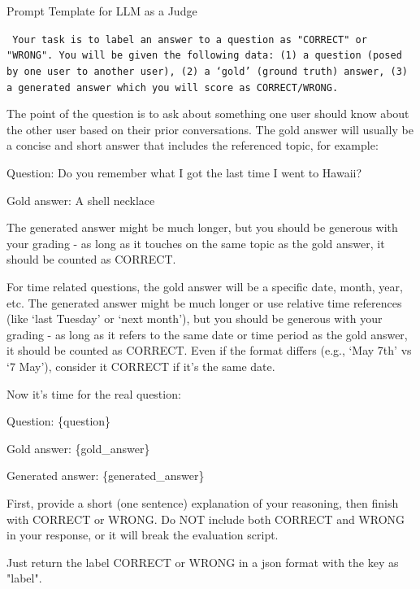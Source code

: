 \begin{EqBox}[!htbp]{Prompt Template for LLM as a Judge}
\vspace{1mm}
{\tt \footnotesize  
Your task is to label an answer to a question as "CORRECT" or "WRONG". 
You will be given the following data:
    (1) a question (posed by one user to another user), 
    (2) a `gold' (ground truth) answer, 
    (3) a generated answer
which you will score as CORRECT/WRONG.

\vspace{0.5cm}
The point of the question is to ask about something one user should know about the other user based on their prior conversations.
The gold answer will usually be a concise and short answer that includes the referenced topic, for example:

Question: Do you remember what I got the last time I went to Hawaii?

Gold answer: A shell necklace

The generated answer might be much longer, but you should be generous with your grading - as long as it touches on the same topic as the gold answer, it should be counted as CORRECT. 

\vspace{0.5cm}
For time related questions, the gold answer will be a specific date, month, year, etc. The generated answer might be much longer or use relative time references (like `last Tuesday' or `next month'), but you should be generous with your grading - as long as it refers to the same date or time period as the gold answer, it should be counted as CORRECT. Even if the format differs (e.g., `May 7th' vs `7 May'), consider it CORRECT if it's the same date.

\vspace{0.5cm}
Now it's time for the real question:

Question: \{question\}

Gold answer: \{gold\_answer\}

Generated answer: \{generated\_answer\}

\vspace{0.5cm}
First, provide a short (one sentence) explanation of your reasoning, then finish with CORRECT or WRONG. 
Do NOT include both CORRECT and WRONG in your response, or it will break the evaluation script.

\vspace{0.5cm}
Just return the label CORRECT or WRONG in a json format with the key as "label".
}
\end{EqBox}

